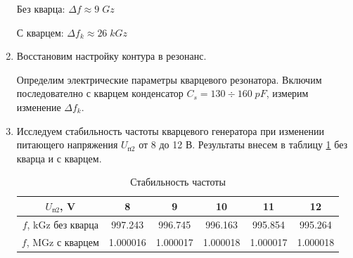 \documentclass[a4paper]{article}
\begin{document}
\begin{enumerate}
    \begin{center}
        Без кварца: $\Delta f \approx 9\; Gz$ \par 
        С кварцем: $\Delta f_k \approx 26\; kGz$
    \end{center}

    \begin{center}
    \end{center}



    \item Восстановим настройку контура в резонанс.  \par 
    
    Определим электрические параметры кварцевого резонатора. Включим последователно с кварцем конденсатор $C_s = 130 \div 160\; pF$, измерим изменение $\Delta f_k$.

    \begin{center}
         \par 
         \par 
         \par 
    \end{center}

    \item Исследуем стабильность частоты кварцевого генератора при изменении питающего напряжения $U_{п2}$ от 8 до 12 В. Результаты внесем в таблицу \ref{t3} без кварца и с кварцем.
    
    \begin{table}[H]
        \centering
        \begin{center}
        \end{center}
        \vspace{0.1cm}
        \begin{tabular}{|c|c|c|c|c|c|}
            \hline
            $U_{п2}$, V & 8&9&10&11&12 \\ 
            \hline
            $f$, kGz без кварца  &997.243&  996.745& 996.163& 995.854& 995.264 \\ 
            \hline
            $f$, MGz с кварцем  &1.000016&  1.000017& 1.000018& 1.000017& 1.000018 \\ 
            \hline
            \end{tabular}
            \caption{Стабильность частоты}
            \label{t3}
    \end{table}


\end{enumerate}
\end{document}
